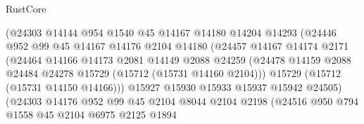 \begin{lexlean}{RustCore}
\begin{coremodule}
                              (@24303
                                @14144
                                @954
                                @1540
                                @45
                                @14167
                                @14180
                                @14204
                                @14293
                                (@24446
                                  @952
                                  @99
                                  @45
                                  @14167
                                  @14176
                                  @2104
                                  @14180
                                  (@24457
                                    @14167
                                    @14174
                                    @2171
                                    (@24464
                                      @14166
                                      @14173
                                      @2081
                                      @14149
                                      @2088
                                      @24259
                                      (@24478
                                        @14159
                                        @2088
                                        @24484
                                        @24278
                                        @15729
                                        (@15712 (@15731 @14160 @2104)))
                                      @15729
                                      (@15712 (@15731 @14150 @14166)))
                                    @15927
                                    @15930
                                    @15933
                                    @15937
                                    @15942
                                    @24505)
                                  (@24303
                                    @14176
                                    @952
                                    @99
                                    @45
                                    @2104
                                    @8044
                                    @2104
                                    @2198
                                    (@24516
                                      @950
                                      @794
                                      @1558
                                      @45
                                      @2104
                                      @6975
                                      @2125
                                      @1894

\end{coremodule}
\end{lexlean}
